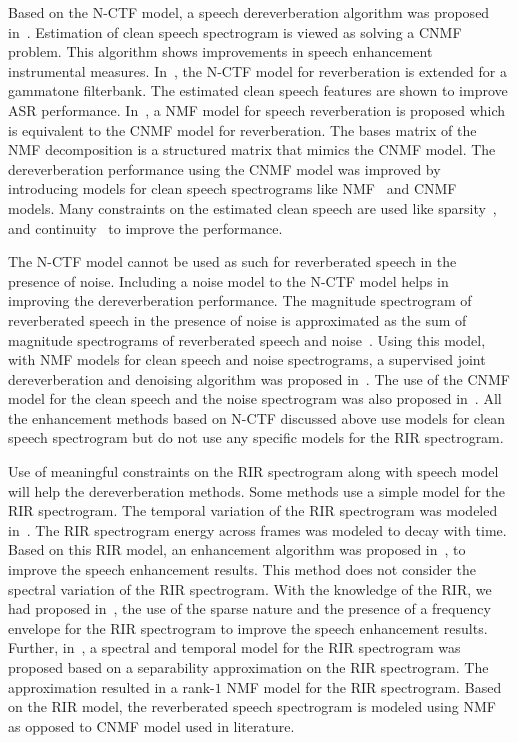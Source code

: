 Based on the N-CTF model, a speech dereverberation algorithm was proposed in~\cite{kameoka2009robust}. Estimation of clean speech spectrogram is viewed as solving a CNMF problem. This algorithm shows improvements in speech enhancement instrumental measures. In~\cite{Kumar2011}, the N-CTF model for reverberation is extended for a gammatone filterbank. The estimated clean speech features are shown to improve ASR performance. In~\cite{Kallasjoki2014}, a NMF model for speech reverberation is proposed which is equivalent to the CNMF model for reverberation. The bases matrix of the NMF decomposition is a structured matrix that mimics the CNMF model. 
The dereverberation performance using the CNMF model was improved by introducing models for clean speech spectrograms like NMF~\cite{mohammadiha2016speech, Mohammadiha2015} and CNMF~\cite{Mirsamadi2014} models. Many constraints on the estimated clean speech are used like sparsity~\cite{mohammadiha2016speech, Mohammadiha2015}, and continuity~\cite{wager2018collaborative} to improve the performance.

The N-CTF model cannot be used as such for reverberated speech in the presence of noise. Including a noise model to the N-CTF model helps in improving the dereverberation performance. The magnitude spectrogram of reverberated speech in the presence of noise is approximated as the sum of magnitude spectrograms of reverberated speech and noise~\cite{li2018multichannel}. Using this model, with NMF models for clean speech and noise spectrograms, a supervised joint dereverberation and denoising algorithm was proposed in~\cite{baby2016supervised}. The use of the CNMF model for the clean speech and the noise spectrogram was also proposed in~\cite{baby2016supervised, baby2016phd}. All the enhancement methods based on N-CTF discussed above use models for clean speech spectrogram but do not use any specific models for the RIR spectrogram.

Use of meaningful constraints on the RIR spectrogram along with speech model will help the dereverberation methods. Some methods use a simple model for the RIR spectrogram. The temporal variation of the RIR spectrogram was modeled in~\cite{baby2016supervised}. The RIR spectrogram energy across frames was modeled to decay with time. Based on this RIR model, an enhancement algorithm was proposed in~\cite{baby2017joint}, to improve the speech enhancement results. This method does not consider the spectral variation of the RIR spectrogram. With the knowledge of the RIR, we had proposed in~\cite{mohanan2017speech}, the use of the sparse nature and the presence of a frequency envelope for the RIR spectrogram to improve the speech enhancement results. Further, in~\cite{mohanan201a}, a spectral and temporal model for the RIR spectrogram was proposed based on a separability approximation on the RIR spectrogram. The approximation resulted in a rank-$1$ NMF model for the RIR spectrogram. Based on the RIR model, the reverberated speech spectrogram is modeled using NMF as opposed to CNMF model used in literature.

